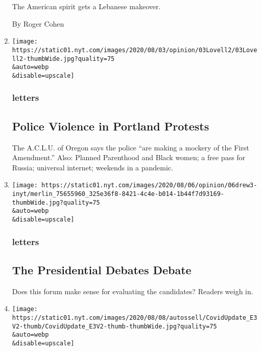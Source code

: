 \begin{enumerate}
  The American spirit gets a Lebanese makeover.

  By Roger Cohen
\item
  \href{/2020/08/07/opinion/letters/portland-police.html}{}

  \texttt{[image: https://static01.nyt.com/images/2020/08/03/opinion/03Lovell2/03Lovell2-thumbWide.jpg?quality=75\\\&auto=webp\\\&disable=upscale]}

  \hypertarget{letters-1}{%
  \subsubsection{letters}\label{letters-1}}

  \hypertarget{police-violence-in-portland-protests}{%
  \subsection{Police Violence in Portland
  Protests}\label{police-violence-in-portland-protests}}

  The A.C.L.U. of Oregon says the police ``are making a mockery of the
  First Amendment.'' Also: Planned Parenthood and Black women; a free
  pass for Russia; universal internet; weekends in a pandemic.
\item
  \href{/2020/08/07/opinion/letters/presidential-debates.html}{}

  \texttt{[image: https://static01.nyt.com/images/2020/08/06/opinion/06drew3-inyt/merlin\_75655960\_325e36f8-8421-4c4e-b014-1b44f7d93169-thumbWide.jpg?quality=75\\\&auto=webp\\\&disable=upscale]}

  \hypertarget{letters-2}{%
  \subsubsection{letters}\label{letters-2}}

  \hypertarget{the-presidential-debates-debate}{%
  \subsection{The Presidential Debates
  Debate}\label{the-presidential-debates-debate}}

  Does this forum make sense for evaluating the candidates? Readers
  weigh in.
\item
  \href{/video/opinion/100000007278127/coronavirus-vaccine-update.html}{}

  \texttt{[image: https://static01.nyt.com/images/2020/08/08/autossell/CovidUpdate\_E3V2-thumb/CovidUpdate\_E3V2-thumb-thumbWide.jpg?quality=75\\\&auto=webp\\\&disable=upscale]}


\end{enumerate}
